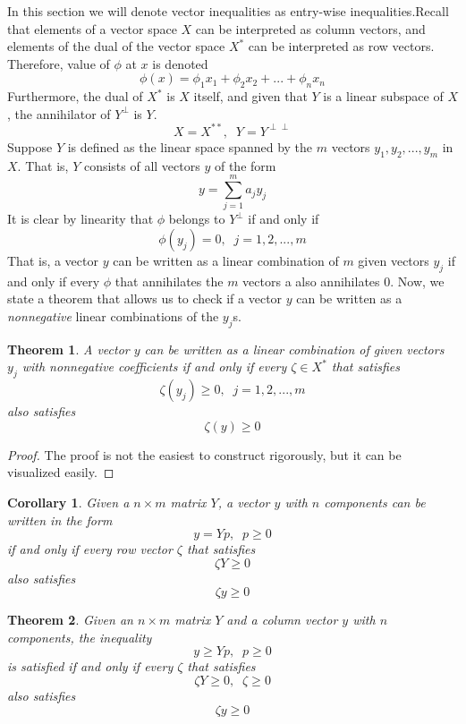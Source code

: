 \documentclass{article}
\newtheorem{theorem}{Theorem}[section]
\newtheorem{corollary}{Corollary}[theorem]
\theoremstyle{remark}
\theoremstyle{definition}
\begin{document}
    In this section we will denote vector inequalities as entry-wise inequalities.Recall that elements of a vector space $X$ can be interpreted as column vectors, and elements of the dual of the vector space $X^*$ can be interpreted as row vectors. Therefore, value of $\phi$ at $x$ is denoted
    \[\phi (x) = \phi_1 x_1 + \phi_2 x_2 + ... + \phi_n x_n\]
    Furthermore, the dual of $X^*$ is $X$ itself, and given that $Y$ is a linear subspace of $X$, the annihilator of $Y^\perp$ is $Y$. 
    \[X = X^{**}, \;\; Y = Y^{\perp\perp}\]
    Suppose $Y$ is defined as the linear space spanned by the $m$ vectors $y_1, y_2, ..., y_m$ in $X$. That is, $Y$ consists of all vectors $y$ of the form
    \[y = \sum_{j=1}^m a_j y_j\]
    It is clear by linearity that $\phi$ belongs to $Y^\perp$ if and only if
    \[\phi (y_j) = 0, \;\; j = 1, 2, ..., m\]
    That is, a vector $y$ can be written as a linear combination of $m$ given vectors $y_j$ if and only if every $\phi$ that annihilates the $m$ vectors a also annihilates $0$. Now, we state a theorem that allows us to check if a vector $y$ can be written as a \textit{nonnegative} linear combinations of the $y_j$s. 

    \begin{theorem}
    A vector $y$ can be written as a linear combination of given vectors $y_j$ with nonnegative coefficients if and only if every $\zeta \in X^*$ that satisfies 
    \[ \zeta (y_j) \geq 0, \;\; j = 1, 2, ..., m\]
    also satisfies 
    \[\zeta (y) \geq 0\]
    \end{theorem}
    \begin{proof}
    The proof is not the easiest to construct rigorously, but it can be visualized easily. 
    \end{proof}

    \begin{corollary}
    Given a $n \times m$ matrix $Y$, a vector $y$ with $n$ components can be written in the form 
    \[y = Y p, \;\; p \geq 0\]
    if and only if every row vector $\zeta$ that satisfies 
    \[\zeta Y \geq 0\]
    also satisfies 
    \[\zeta y \geq 0\]
    \end{corollary}

    \begin{theorem}
    Given an $n \times m$ matrix $Y$ and a column vector $y$ with $n$ components, the inequality 
    \[y \geq Y p, \;\; p \geq 0\]
    is satisfied if and only if every $\zeta$ that satisfies
    \[\zeta Y \geq 0, \;\; \zeta \geq 0\]
    also satisfies 
    \[\zeta y \geq 0\]
    \end{theorem}
\end{document}
